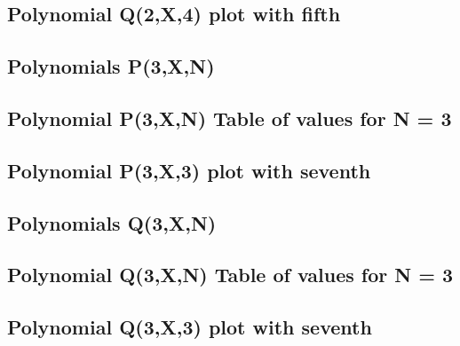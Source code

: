 \documentclass[12pt,letterpaper,oneside,reqno]{amsart}
\begin{document}
    \subsection{Polynomial Q(2,X,4) plot with fifth}
    


    \subsection{Polynomials P(3,X,N)}
    

    \subsection{Polynomial P(3,X,N) Table of values for N = 3}
    

    \subsection{Polynomial P(3,X,3) plot with seventh}
    


    \subsection{Polynomials Q(3,X,N)}
    

    \subsection{Polynomial Q(3,X,N) Table of values for N = 3}
    

    \subsection{Polynomial Q(3,X,3) plot with seventh}
    
\end{document}
